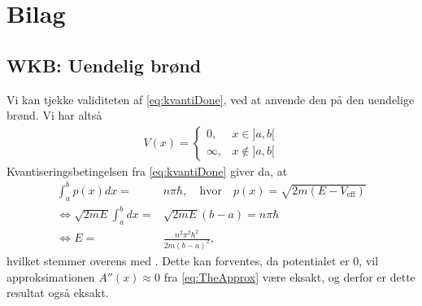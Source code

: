 \section{Bilag}
\subsection{WKB: Uendelig brønd}
Vi kan tjekke validiteten af \cref{eq:kvantiDone}, ved at anvende den på den uendelige brønd. Vi har altså
\begin{align}
    V(x) =
    \begin{cases}
    0, & x\in]a, b[ \\
    \infty, & x\notin]a, b[
    \end{cases}
\end{align}
Kvantiseringsbetingelsen fra \cref{eq:kvantiDone} giver da, at
\begin{align}
    \int_{a}^{b} p(x) dx = & n\pi \hbar, \quad \text{hvor} \quad p(x) = \sqrt{2m(E-V_{\text{eff}})}\\
    \Leftrightarrow \sqrt{2mE}\int_{a}^{b} dx = & \sqrt{2mE}(b-a) = n\pi \hbar\\
    \Leftrightarrow E = & \frac{n^{2}\pi^{2}\hbar^{2}}{2m(b-a)^{2}},
\end{align}
hvilket stemmer overens med \cite[s. 30]{griffiths}. Dette kan forventes, da potentialet er $0$, vil approksimationen $A''(x) \approx 0$ fra \cref{eq:TheApprox} være eksakt, og derfor er dette resultat også eksakt.
